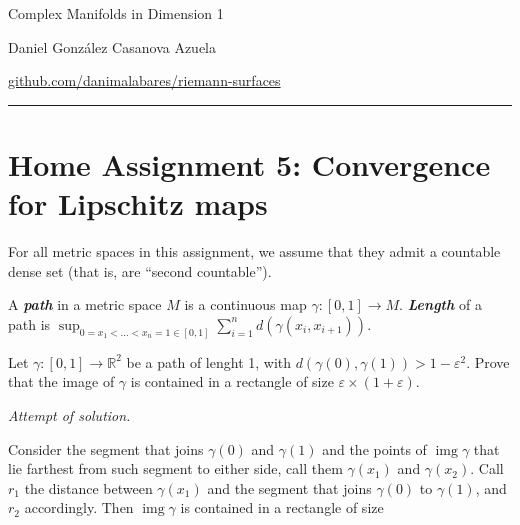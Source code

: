 \documentclass{article}
\newcommand{\R}{\mathbb{R}}
\DeclareMathOperator{\img}{img}
\begin{document}
\begin{minipage}{\textwidth}
	\begin{minipage}{.5\textwidth}
		Complex Manifolds in Dimension 1\\
	\end{minipage}%
	\begin{minipage}{.5\textwidth}
		\raggedleft
		Daniel González Casanova Azuela\par
		{\small\href{https://github.com/danimalabares/riemann-surfaces}{github.com/danimalabares/riemann-surfaces}}
	\end{minipage}%
\end{minipage}\vspace{.2cm}\hrule
\section{Home Assignment 5: Convergence for Lipschitz maps}
\setcounter{section}{5}
\begin{remark}
	For all metric spaces in this assignment, we assume that they admit a countable dense set (that is, are “second countable”).
\end{remark}
\begin{defn}
	A \textbf{\textit{path}} in a metric space $M$ is a continuous map $\gamma : [0, 1] \to M$. \textbf{\textit{Length}} of a path is $\sup_{0=x_1<\ldots<x_n=1\in[0,1]}\sum_{i=1}^nd(\gamma(x_i,x_{i+1}))$.
\end{defn}
\begin{exercise}
	Let $\gamma:[0,1]\to\R^2$ be a path of lenght 1, with $d(\gamma(0),\gamma(1))>1-\varepsilon^2$. Prove that the image of $\gamma$ is contained in a rectangle of size $\varepsilon\times(1+\varepsilon)$.
\end{exercise}
\textit{Attempt of solution.$\quad$}

	Consider the segment that joins $\gamma(0)$ and $\gamma(1)$ and the points of $\img\gamma$ that lie farthest from such segment to either side, call them $\gamma(x_1)$ and $\gamma(x_2)$. Call $r_1$ the distance between $\gamma(x_1)$ and the segment that joins $\gamma(0)$ to $\gamma(1)$, and $r_2$ accordingly. Then $\img\gamma$ is contained in a rectangle of size
\end{document}
